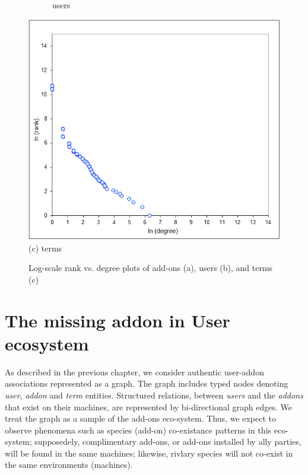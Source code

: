 \documentclass[11pt,oneside]{book}
\begin{document}
\begin{figure}[t]
\begin{subfigure}[b]{0.49\textwidth}
\caption{users}
\end{subfigure}
	\centering
\includegraphics[scale=0.48]{figures/zipf-terms.png} \\
(c) terms \\
\caption{Log-scale rank vs. degree plots of add-ons (a), users (b), and terms (c)}
	\label{fig:minlen2noremove}
\end{figure}

\chapter{The missing addon in User ecosystem}
\label{fig:zipf}

As described in the previous chapter, we consider authentic user-addon
associations represented as a graph.  The graph includes typed nodes
denoting {\it user}, {\it addon} and {\it term} entities. Structured
relations, between {\it users} and the {\it addons} that exist on
their machines, are represented by bi-directional graph edges. We
treat the graph as a sample of the add-ons eco-system. Thus, we expect
to observe phenomena such as species (add-on) co-existance patterns in
this eco-system; supposedely, complimentary add-ons, or add-ons
installed by ally parties, will be found in the same machines;
likewise, rivlary species will not co-exist in the same environments
(machines).
\end{document}
